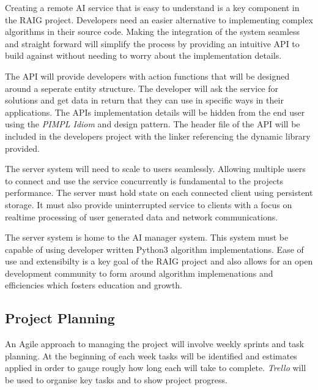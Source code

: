 \documentclass[12pt,a4paper,titlepage]{article}
\begin{document}
Creating a remote AI service that is easy to understand is a key component in the RAIG project. Developers need an easier alternative to implementing complex algorithms in their source code. Making the integration of the system seamless and straight forward will simplify the process by providing an intuitive API to build against without needing to worry about the implementation details. 

The API will provide developers with action functions that will be designed around a seperate entity structure. The developer will ask the service for solutions and get data in return that they can use in specific ways in their applications. The APIs implementation details will be hidden from the end user using the \textit{PIMPL Idiom} and design pattern. The header file of the API will be included in the developers project with the linker referencing the dynamic library provided. 

The server system will need to scale to users seamlessly. Allowing multiple users to connect and use the service concurrently is fundamental to the projects performance. The server must hold state on each connected client using persistent storage. It must also provide uninterrupted service to clients with a focus on realtime processing of user generated data and network communications. 

The server system is home to the AI manager system. This system must be capable of using developer written Python3 algorithm implementations. Ease of use and extensibilty is a key goal of the RAIG project and also allows for an open development community to form around algorithm implemenations and efficiencies which fosters education and growth. 

\subsection{Project Planning}
%

An Agile approach to managing the project will involve weekly sprints and task planning. At the beginning of each week tasks will be identified and estimates applied in order to gauge rougly how long each will take to complete. \textit{Trello}\cite{trello} will be used to organise key tasks and to show project progress. 
\end{document}
